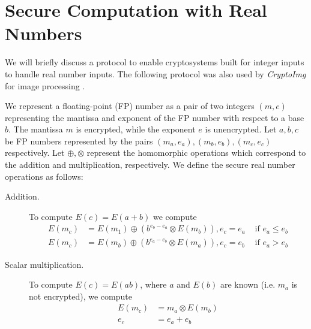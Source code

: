 \section{Secure Computation with Real Numbers}
We will briefly discuss a protocol to enable cryptosystems built for integer inputs to handle real number inputs.
The following protocol was also used by \textit{CryptoImg} for image processing \cite{ziad_cryptoimg:_2016}.

We represent a floating-point (FP) number as a pair of two integers $(m,e)$ representing the mantissa and exponent of the FP number with respect to a base $b$. The mantissa $m$ is encrypted, while the exponent $e$ is unencrypted.
Let $a,b,c$ be FP numbers represented by the pairs $(m_a,e_a),(m_b,e_b),(m_c,e_c)$ respectively. Let $\oplus,\otimes$ represent the homomorphic operations which correspond to the addition and multiplication, respectively. We define the secure real number operations as follows:
\begin{description}
  \item[Addition.]
    To compute $E(c)=E(a+b)$ we compute
    \begin{align*}
      E(m_c) &= E(m_1) \oplus (b^{e_b-e_a} \otimes E(m_b)), e_c = e_a & \text{ if } e_a \leq e_b \\
      E(m_c) &= E(m_b) \oplus (b^{e_a-e_b} \otimes E(m_a)), e_c = e_b & \text{ if } e_a > e_b
    \end{align*}
  \item[Scalar multiplication.]
    To compute $E(c) = E(ab)$, where $a$ and $E(b)$ are known (i.e. $m_a$ is not encrypted), we compute
    \begin{align*}
      E(m_c) &= m_a \otimes E(m_b)\\
      e_c &= e_a + e_b
    \end{align*}
\end{description}
